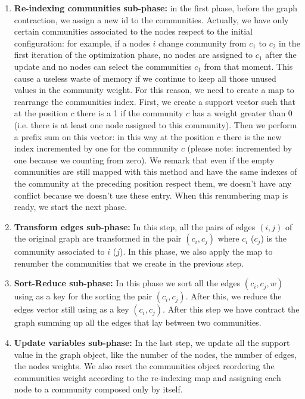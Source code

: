 \begin{enumerate}
	\item \textbf{Re-indexing communities sub-phase:}\label{Re-indexing} in the first phase, before the graph contraction, we assign a new id to the communities. Actually, we have only certain communities associated to the nodes respect to the initial configuration: for example, if a nodes $i$ change community from $c_1$ to $c_2$ in the first iteration of the optimization phase, no nodes are assigned to $c_1$ after the update and no nodes can select the communities $c_1$ from that moment. This cause a useless waste of memory if we continue to keep all those unused values in the community weight. For this reason, we need to create a map to rearrange the communities index.
	First, we create a support vector such that at the position $c$ there is a 1 if the community $c$ has a weight greater than 0 (i.e. there is at least one node assigned to this community). Then we perform a prefix sum on this vector: in this way at the position $c$ there is the new index incremented by one for the community $c$ (please note: incremented by one because we counting from zero).
	 We remark that even if the empty communities are still mapped with this method and have the same indexes of the community at the preceding position respect them, we doesn't have any conflict because we doesn't use these entry.
	 When this renumbering map is ready, we start the next phase.
	\item \textbf{Transform edges sub-phase:} In this step, all the pairs of edges $(i, j)$ of the original graph are transformed in the pair $(c_i, c_j)$ where $c_i$ ($c_j$) is the community associated to $i$ ($j$). In this phase, we also apply the map to renumber the communities that we create in the previous step. 
	\item \textbf{Sort-Reduce sub-phase:} In this phase we sort all the edges $(c_i, c_j, w)$ using as a key for the sorting the pair $(c_i, c_j)$. After this, we reduce the edges vector still using as a key $(c_i, c_j)$. After this step we have contract the graph summing up all the edges that lay between two communities.
	\item \textbf{Update variables sub-phase:}\label{updategraph}  In the last step, we update all the support value in the graph object, like the number of the nodes, the number of edges, the nodes weights. We also reset the communities object reordering the communities weight according to the re-indexing map and assigning each node to a community composed only by itself.
\end{enumerate}
